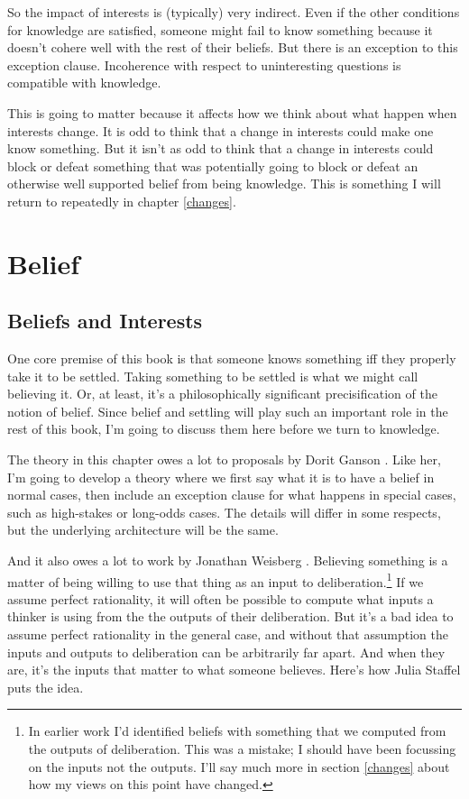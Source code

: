 \documentclass[
  11pt,
]{book}
\begin{document}
So the impact of interests is (typically) very indirect. Even if the other conditions for knowledge are satisfied, someone might fail to know something because it doesn't cohere well with the rest of their beliefs. But there is an exception to this exception clause. Incoherence with respect to uninteresting questions is compatible with knowledge.

This is going to matter because it affects how we think about what happen when interests change. It is odd to think that a change in interests could make one know something. But it isn't as odd to think that a change in interests could block or defeat something that was potentially going to block or defeat an otherwise well supported belief from being knowledge. This is something I will return to repeatedly in chapter \ref{changes}.

\hypertarget{belief}{%
\chapter{Belief}\label{belief}}

\hypertarget{beliefsinterests}{%
\section{Beliefs and Interests}\label{beliefsinterests}}

One core premise of this book is that someone knows something iff they properly take it to be settled. Taking something to be settled is what we might call believing it. Or, at least, it's a philosophically significant precisification of the notion of belief. Since belief and settling will play such an important role in the rest of this book, I'm going to discuss them here before we turn to knowledge.

The theory in this chapter owes a lot to proposals by Dorit Ganson \citetext{\citeyear{Ganson2008}; \citeyear{Ganson2019}}. Like her, I'm going to develop a theory where we first say what it is to have a belief in normal cases, then include an exception clause for what happens in special cases, such as high-stakes or long-odds cases. The details will differ in some respects, but the underlying architecture will be the same.

And it also owes a lot to work by Jonathan Weisberg \citetext{\citeyear{Weisberg2013}; \citeyear{Weisberg2020}}. Believing something is a matter of being willing to use that thing as an input to deliberation.\footnote{In earlier work I'd identified beliefs with something that we computed from the outputs of deliberation. This was a mistake; I should have been focussing on the inputs not the outputs. I'll say much more in section \ref{changes} about how my views on this point have changed.} If we assume perfect rationality, it will often be possible to compute what inputs a thinker is using from the the outputs of their deliberation. But it's a bad idea to assume perfect rationality in the general case, and without that assumption the inputs and outputs to deliberation can be arbitrarily far apart. And when they are, it's the inputs that matter to what someone believes. Here's how Julia Staffel puts the idea.
\end{document}
